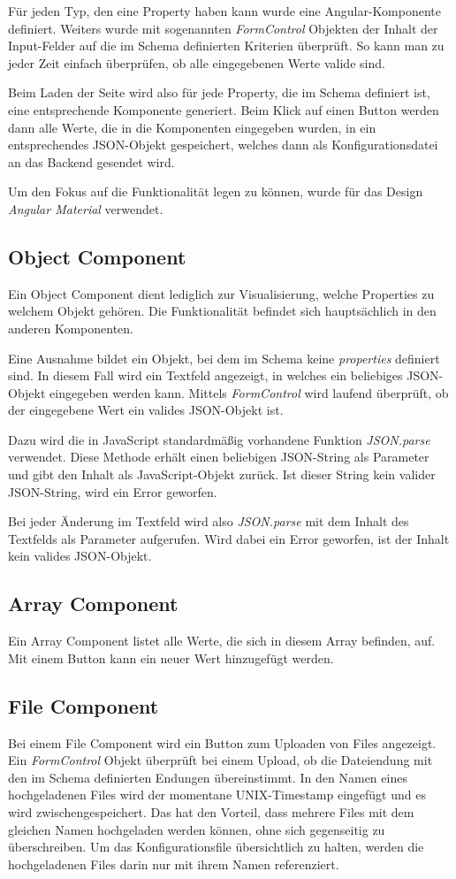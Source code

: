 Für jeden Typ, den eine Property haben kann wurde eine Angular-Komponente definiert.
Weiters wurde mit sogenannten \textit{FormControl} Objekten der Inhalt der Input-Felder auf die im Schema definierten
Kriterien überprüft.
So kann man zu jeder Zeit einfach überprüfen, ob alle eingegebenen Werte valide sind.

Beim Laden der Seite wird also für jede Property, die im Schema definiert ist, eine entsprechende Komponente generiert.
Beim Klick auf einen Button werden dann alle Werte, die in die Komponenten eingegeben wurden, in ein entsprechendes
JSON-Objekt gespeichert, welches dann als Konfigurationsdatei an das Backend gesendet wird.

Um den Fokus auf die Funktionalität legen zu können, wurde für das Design \textit{Angular Material} verwendet.

\subsection{Object Component}
Ein Object Component dient lediglich zur Visualisierung, welche Properties zu welchem Objekt gehören.
Die Funktionalität befindet sich hauptsächlich in den anderen Komponenten.

Eine Ausnahme bildet ein Objekt, bei dem im Schema keine \textit{properties} definiert sind.
In diesem Fall wird ein Textfeld angezeigt, in welches ein beliebiges JSON-Objekt eingegeben werden kann.
Mittels \textit{FormControl} wird laufend überprüft, ob der eingegebene Wert ein valides JSON-Objekt ist.

Dazu wird die in JavaScript standardmäßig vorhandene Funktion \textit{JSON.parse} verwendet.
Diese Methode erhält einen beliebigen JSON-String als Parameter und gibt den Inhalt als JavaScript-Objekt zurück.
Ist dieser String kein valider JSON-String, wird ein Error geworfen.

Bei jeder Änderung im Textfeld wird also \textit{JSON.parse} mit dem Inhalt des Textfelds als Parameter aufgerufen.
Wird dabei ein Error geworfen, ist der Inhalt kein valides JSON-Objekt.

\subsection{Array Component}
Ein Array Component listet alle Werte, die sich in diesem Array befinden, auf.
Mit einem Button kann ein neuer Wert hinzugefügt werden.

\subsection{File Component}
Bei einem File Component wird ein Button zum Uploaden von Files angezeigt.
Ein \textit{FormControl} Objekt überprüft bei einem Upload, ob die Dateiendung mit den im Schema definierten
Endungen übereinstimmt.
In den Namen eines hochgeladenen Files wird der momentane UNIX-Timestamp eingefügt und es wird zwischengespeichert.
Das hat den Vorteil, dass mehrere Files mit dem gleichen Namen hochgeladen werden können, ohne sich gegenseitig zu
überschreiben.
Um das Konfigurationsfile übersichtlich zu halten, werden die hochgeladenen Files darin nur mit ihrem Namen referenziert.

